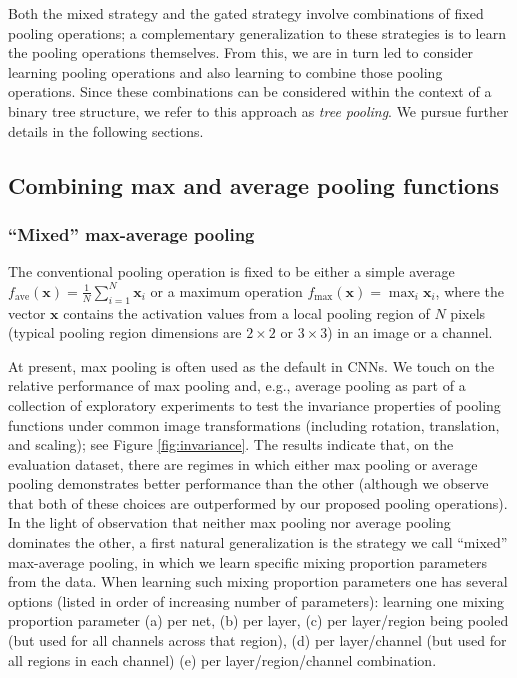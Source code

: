 \documentclass[twoside]{article}
\begin{document}
Both the mixed strategy and the gated strategy involve combinations of fixed pooling
operations; a complementary generalization to these strategies is to learn 
the pooling operations themselves. From this, we are in turn led to consider learning pooling 
operations and also learning to combine those pooling operations. Since these combinations 
can be considered within the context of a binary tree structure, we refer to 
this approach as \emph{tree pooling}. We pursue further details in the following 
sections.

\vspace{-4mm}
\subsection{Combining max and average pooling functions}
\vspace{-2.7mm}

\subsubsection{``Mixed'' max-average pooling}
\vspace{-2.7mm}
The conventional pooling operation is fixed to be either a simple average
$ f_{\text{ave}}({\mathbf{x}})=\frac{1}{N}\sum^{N}_{i=1}{{\mathbf{x}}_i} $ or
a maximum operation $f_{\text{max}}({\mathbf{x}})=\max_i{{\mathbf{x}}_i}$, 
where the vector ${\mathbf{x}}$ contains the  
activation values from a local pooling region of $N$ pixels (typical pooling 
region dimensions are $2\times2$ or $3\times3$) in an image or a channel. 

At present, max pooling is often used as the default in CNNs. We touch on the relative 
performance of max pooling and, e.g., average pooling as part 
of a collection of exploratory experiments to test the invariance properties of pooling
functions under common image transformations (including rotation, translation, 
and scaling); see Figure \ref{fig:invariance}. The results indicate that, on the 
evaluation dataset, there are regimes in which either max pooling or average pooling 
demonstrates better performance than the other (although we observe that both of 
these choices are outperformed by our proposed pooling operations). In the light 
of observation that neither max pooling nor average pooling dominates the other, 
a first natural generalization is the strategy we call ``mixed'' max-average pooling,
in which we learn specific mixing proportion parameters from the data. When 
learning such mixing proportion parameters one has several options (listed in order of
increasing number of parameters): learning one mixing proportion parameter (a) per 
net, (b) per layer, (c) per layer/region being pooled (but used for all channels across 
that region), (d) per layer/channel (but used for all regions in each channel) 
(e) per layer/region/channel combination.
\end{document}
